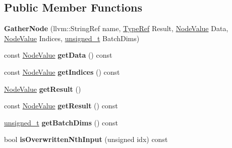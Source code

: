 \subsection*{Public Member Functions}
\begin{DoxyCompactItemize}
\item 
\mbox{\label{classglow_1_1_gather_node_a2df6df973b51f2db352ddb73bb678f1b}} 
{\bfseries Gather\+Node} (llvm\+::\+String\+Ref name, \hyperlink{structglow_1_1_type}{Type\+Ref} Result, \hyperlink{structglow_1_1_node_value}{Node\+Value} Data, \hyperlink{structglow_1_1_node_value}{Node\+Value} Indices, \hyperlink{namespaceglow_a0ca574644e1e42ef193a9947fb4d8911}{unsigned\+\_\+t} Batch\+Dims)
\item 
\mbox{\label{classglow_1_1_gather_node_ab207ab6c9b4501ec758e6bbf9ae9c0d1}} 
const \hyperlink{structglow_1_1_node_value}{Node\+Value} {\bfseries get\+Data} () const
\item 
\mbox{\label{classglow_1_1_gather_node_a93eabd62b5461ba0a3f0b84a8cd5f898}} 
const \hyperlink{structglow_1_1_node_value}{Node\+Value} {\bfseries get\+Indices} () const
\item 
\mbox{\label{classglow_1_1_gather_node_af0db7f8e6d1847f6277ada1aa07ff812}} 
\hyperlink{structglow_1_1_node_value}{Node\+Value} {\bfseries get\+Result} ()
\item 
\mbox{\label{classglow_1_1_gather_node_a020c35fbd707271785c646c51ed499d2}} 
const \hyperlink{structglow_1_1_node_value}{Node\+Value} {\bfseries get\+Result} () const
\item 
\mbox{\label{classglow_1_1_gather_node_a0412da12ce5d95a8ebbdae963ec57668}} 
\hyperlink{namespaceglow_a0ca574644e1e42ef193a9947fb4d8911}{unsigned\+\_\+t} {\bfseries get\+Batch\+Dims} () const
\item 
\mbox{\label{classglow_1_1_gather_node_a91a39b869066d450a519bd5bc47d17d8}} 
bool {\bfseries is\+Overwritten\+Nth\+Input} (unsigned idx) const
\item 
\mbox{\label{classglow_1_1_gather_node_a363d2104db746bb14ed7d770917513c0}} 

\end{DoxyCompactItemize}
